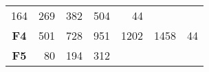 \documentclass[12pt,a4paper]{article}
\begin{document}
\begin{longtable}[c]{@{}crrrrrr@{}}
\begin{minipage}[t]{0.08\columnwidth}\raggedleft\strut
164
\strut\end{minipage} &
\begin{minipage}[t]{0.09\columnwidth}\raggedleft\strut
269
\strut\end{minipage} &
\begin{minipage}[t]{0.10\columnwidth}\raggedleft\strut
382
\strut\end{minipage} &
\begin{minipage}[t]{0.11\columnwidth}\raggedleft\strut
504
\strut\end{minipage} &
\begin{minipage}[t]{0.07\columnwidth}\raggedleft\strut
44
\strut\end{minipage}\tabularnewline
\begin{minipage}[t]{0.11\columnwidth}\centering\strut
\textbf{F4}
\strut\end{minipage} &
\begin{minipage}[t]{0.08\columnwidth}\raggedleft\strut
501
\strut\end{minipage} &
\begin{minipage}[t]{0.08\columnwidth}\raggedleft\strut
728
\strut\end{minipage} &
\begin{minipage}[t]{0.09\columnwidth}\raggedleft\strut
951
\strut\end{minipage} &
\begin{minipage}[t]{0.10\columnwidth}\raggedleft\strut
1202
\strut\end{minipage} &
\begin{minipage}[t]{0.11\columnwidth}\raggedleft\strut
1458
\strut\end{minipage} &
\begin{minipage}[t]{0.07\columnwidth}\raggedleft\strut
44
\strut\end{minipage}\tabularnewline
\begin{minipage}[t]{0.11\columnwidth}\centering\strut
\textbf{F5}
\strut\end{minipage} &
\begin{minipage}[t]{0.08\columnwidth}\raggedleft\strut
80
\strut\end{minipage} &
\begin{minipage}[t]{0.08\columnwidth}\raggedleft\strut
194
\strut\end{minipage} &
\begin{minipage}[t]{0.09\columnwidth}\raggedleft\strut
312
\strut\end{minipage} &

\end{longtable}
\end{document}
